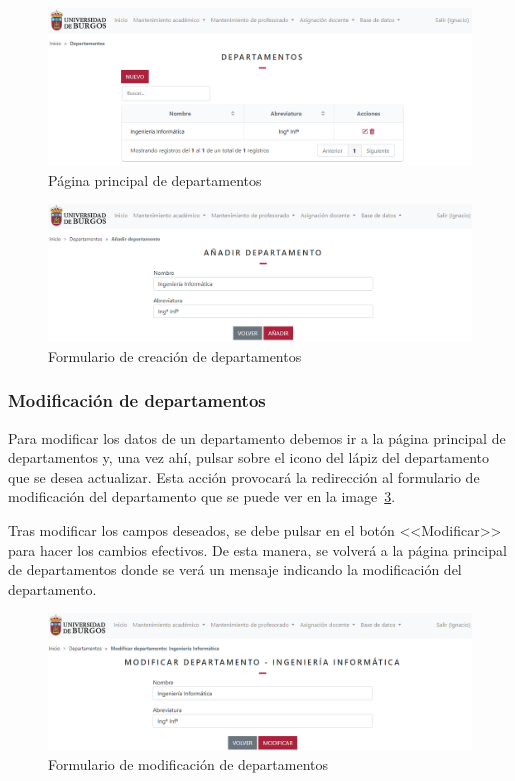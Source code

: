 \begin{figure}
	\centering
	\includegraphics[width=\textwidth]{../img/Anexos/Manual usuario/departamentos.png}
	\caption{Página principal de departamentos}\label{pag:departamentos}
\end{figure}

\begin{figure}
	\centering
	\includegraphics[width=\textwidth]{../img/Anexos/Manual usuario/formDepartamento.png}
	\caption{Formulario de creación de departamentos}\label{pag:formDepartamento}
\end{figure}

\subsubsection{Modificación de departamentos}
Para modificar los datos de un departamento debemos ir a la página principal de departamentos y, una vez ahí, pulsar sobre el icono del lápiz del departamento que se desea actualizar.
Esta acción provocará la redirección al formulario de modificación del departamento que se puede ver en la image~\ref{pag:formModDepartamento}.

Tras modificar los campos deseados, se debe pulsar en el botón <<Modificar>> para hacer los cambios efectivos.
De esta manera, se volverá a la página principal de departamentos donde se verá un mensaje indicando la modificación del departamento.

\begin{figure}
	\centering
	\includegraphics[width=\textwidth]{../img/Anexos/Manual usuario/formModDepartamento.png}
	\caption{Formulario de modificación de departamentos}\label{pag:formModDepartamento}
\end{figure}

